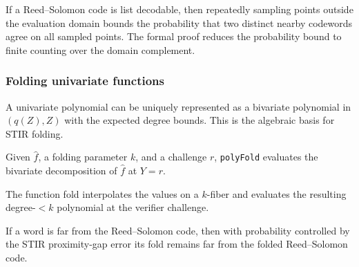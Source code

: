 \begin{lemma}\label{lemma:out_of_domain_smpl}
    If a Reed--Solomon code is list decodable, then repeatedly sampling points outside the
    evaluation domain bounds the probability that two distinct nearby codewords agree on all
    sampled points.  The formal proof reduces the probability bound to finite counting over the
    domain complement.
\end{lemma}

\subsubsection{Folding univariate functions}\label{sec:folding_uf}

\begin{lemma}\label{fact:poly_folding}
    A univariate polynomial can be uniquely represented as a bivariate polynomial in
    $(q(Z),Z)$ with the expected degree bounds.  This is the algebraic basis for STIR folding.
\end{lemma}

\begin{definition}\label{def:poly_folding}
    Given $\hat f$, a folding parameter $k$, and a challenge $r$, \texttt{polyFold} evaluates the
    bivariate decomposition of $\hat f$ at $Y=r$.
\end{definition}

\begin{definition}\label{def:fn_folding}
    The function fold interpolates the values on a $k$-fiber and evaluates the resulting
    degree-$<k$ polynomial at the verifier challenge.
\end{definition}

\begin{lemma}\label{lemma:folding}
    If a word is far from the Reed--Solomon code, then with probability controlled by the
    STIR proximity-gap error its fold remains far from the folded Reed--Solomon code.
\end{lemma}

